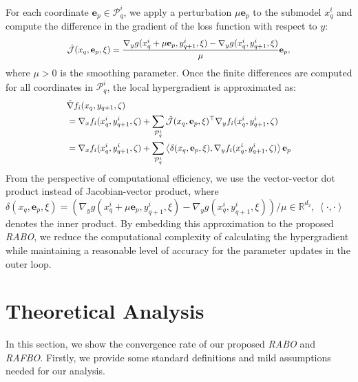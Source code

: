 \documentclass[lettersize,journal]{IEEEtran}
\begin{document}
For each coordinate \( \textbf{e}_p \in \mathcal{P}_q^i \), we apply a perturbation \( \mu \textbf{e}_p \) to the submodel \( x_q^i \) and compute the difference in the gradient of the loss function with respect to \( y \):
\begin{equation}
\scalebox{0.9}{$
\begin{aligned}
\hat{\mathcal{J}}(x_q, \textbf{e}_p, \xi) = \frac{\nabla_y g(x_q^i + \mu \textbf{e}_p, y_{q+1}^i, \xi) - \nabla_y g(x_q^i, y_{q+1}^i, \xi)}{\mu} \textbf{e}_p,
\end{aligned}
$}    
\end{equation} 
where $\mu>0$ is the smoothing parameter. Once the finite differences are computed for all coordinates in \( \mathcal{P}_q^i \), the local hypergradient is approximated as:
\begin{equation}
\scalebox{0.9}{$
\begin{aligned}
  &\hat{\nabla} f_i(x_q,y_{q+1}, \zeta)\\
  &=\nabla_x f_i(x_q^i,y^i_{q+1}, \zeta)+\sum_{\mathcal{P}_{q}^i} \hat{\mathcal{J}}(x_q,\textbf{e}_p, \xi)^\top\nabla_yf_i(x_q^i,y^i_{q+1}, \zeta)\nonumber\\
  &=\nabla_x f_i(x_q^i,y^i_{q+1}, \zeta)+\sum_{\mathcal{P}_{q}^i}\left \langle\delta(x_q,\textbf{e}_p, \xi),\nabla_yf_i(x_q^i,y^i_{q+1}, \zeta)\right \rangle \textbf{e}_p \nonumber 
\end{aligned}
$}    
\end{equation}  
From the perspective of computational efficiency, we use the vector-vector dot product instead of Jacobian-vector product, where $\delta(x_q,\textbf{e}_p, \xi)=(\nabla_y g(x_q^i+\mu\textbf{e}_p,y_{q+1}^i, \xi)-\nabla_y g(x_q^i,y_{q+1}^i, \xi))/\mu\in \mathbb{R}^{d_2}$, $\left\langle \cdot, \cdot \right\rangle$ denotes the inner product. 
By embedding this approximation to the proposed \textit{RABO}, we reduce the computational complexity of calculating the hypergradient while maintaining a reasonable level of accuracy for the parameter updates in the outer loop.

\section{Theoretical Analysis}\label{sec:theory}
In this section, we show the convergence rate of our proposed \textit{RABO} and \textit{RAFBO}. Firstly, we provide some standard definitions and mild assumptions needed for our analysis.
\end{document}
